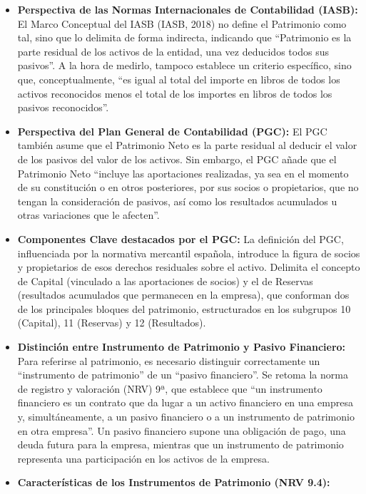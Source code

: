 \documentclass[
  paper=a4,
  ,captions=tableheading
]{scrbook}
\begin{document}
\begin{itemize}
\item
  \textbf{Perspectiva de las Normas Internacionales de Contabilidad
  (IASB):} El Marco Conceptual del IASB (IASB, 2018) no define el
  Patrimonio como tal, sino que lo delimita de forma indirecta,
  indicando que ``Patrimonio es la parte residual de los activos de la
  entidad, una vez deducidos todos sus pasivos''. A la hora de medirlo,
  tampoco establece un criterio específico, sino que, conceptualmente,
  ``es igual al total del importe en libros de todos los activos
  reconocidos menos el total de los importes en libros de todos los
  pasivos reconocidos''.
\item
  \textbf{Perspectiva del Plan General de Contabilidad (PGC):} El PGC
  también asume que el Patrimonio Neto es la parte residual al deducir
  el valor de los pasivos del valor de los activos. Sin embargo, el PGC
  añade que el Patrimonio Neto ``incluye las aportaciones realizadas, ya
  sea en el momento de su constitución o en otros posteriores, por sus
  socios o propietarios, que no tengan la consideración de pasivos, así
  como los resultados acumulados u otras variaciones que le afecten''.
\item
  \textbf{Componentes Clave destacados por el PGC:} La definición del
  PGC, influenciada por la normativa mercantil española, introduce la
  figura de socios y propietarios de esos derechos residuales sobre el
  activo. Delimita el concepto de Capital (vinculado a las aportaciones
  de socios) y el de Reservas (resultados acumulados que permanecen en
  la empresa), que conforman dos de los principales bloques del
  patrimonio, estructurados en los subgrupos 10 (Capital), 11 (Reservas)
  y 12 (Resultados).
\item
  \textbf{Distinción entre Instrumento de Patrimonio y Pasivo
  Financiero:} Para referirse al patrimonio, es necesario distinguir
  correctamente un ``instrumento de patrimonio'' de un ``pasivo
  financiero''. Se retoma la norma de registro y valoración (NRV) 9ª,
  que establece que ``un instrumento financiero es un contrato que da
  lugar a un activo financiero en una empresa y, simultáneamente, a un
  pasivo financiero o a un instrumento de patrimonio en otra empresa''.
  Un pasivo financiero supone una obligación de pago, una deuda futura
  para la empresa, mientras que un instrumento de patrimonio representa
  una participación en los activos de la empresa.
\item
  \textbf{Características de los Instrumentos de Patrimonio (NRV 9.4):}


\end{itemize}
\end{document}
